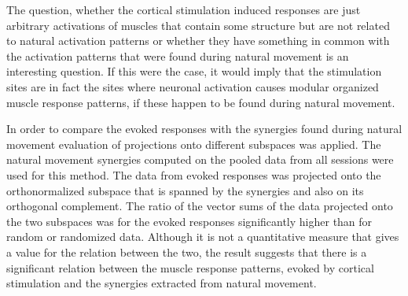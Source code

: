 
The question, whether the cortical stimulation induced responses are just arbitrary activations of muscles that contain some structure but are not related to natural activation patterns or whether they have something in common with the activation patterns that were found during natural movement is an interesting question. If this were the case, it would imply that the stimulation sites are in fact the sites where neuronal activation causes modular organized muscle response patterns, if these happen to be found during natural movement. 

In order to compare the evoked responses with the synergies found during natural movement evaluation of projections onto different subspaces was applied. The natural movement synergies computed on the pooled data from all sessions were used for this method. The data from evoked responses was projected onto the orthonormalized subspace that is spanned by the synergies and also on its orthogonal complement. The ratio of the vector sums of the data projected onto the two subspaces was for the evoked responses significantly higher than for random or randomized data. Although it is not a quantitative measure that gives a value for the relation between the two, the result suggests that there is a significant relation between the muscle response patterns, evoked by cortical stimulation and the synergies extracted from natural movement.


